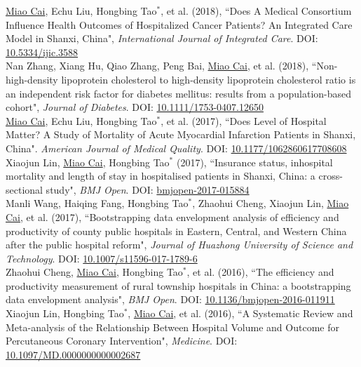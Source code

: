 \documentclass[11pt, a4paper]{article}
\newcommand{\years}[1]{\marginnote{\scriptsize #1}}
\begin{document}
\years{2018}\underline{Miao Cai}, Echu Liu, Hongbing Tao$^\ast$, et al. (2018), ``Does A Medical Consortium Influence Health Outcomes of Hospitalized Cancer Patients? An Integrated Care Model in Shanxi, China", \emph{International Journal of Integrated Care}. DOI: \href{https://doi.org/10.5334/ijic.3588}{10.5334/ijic.3588}\\
\years{2018}Nan Zhang, Xiang Hu, Qiao Zhang, Peng Bai, \underline{Miao Cai}, et al. (2018), ``Non-high-density lipoprotein cholesterol to high-density lipoprotein cholesterol ratio is an independent risk factor for diabetes mellitus: results from a population-based cohort", \emph{Journal of Diabetes}. DOI: \href{https://doi.org/10.1111/1753-0407.12650}{10.1111/1753-0407.12650}\\
\years{2017}\underline{Miao Cai}, Echu Liu, Hongbing Tao$^\ast$, et al. (2017), ``Does Level of Hospital Matter? A Study of Mortality of Acute Myocardial Infarction Patients in Shanxi, China". \emph{American Journal of Medical Quality}. DOI: \href{https://doi.org/10.1177/1062860617708608}{10.1177/1062860617708608}\\
\years{2017}Xiaojun Lin, \underline{Miao Cai}, Hongbing Tao$^\ast$ (2017), ``Insurance status, inhospital mortality and length of stay in hospitalised patients in Shanxi, China: a cross-sectional study", \emph{BMJ Open}. DOI: \href{https://doi.org/10.1136/bmjopen-2017-015884}{bmjopen-2017-015884}\\
\years{2017}Manli Wang, Haiqing Fang, Hongbing Tao$^\ast$, Zhaohui Cheng, Xiaojun Lin, \underline{Miao Cai}, et al. (2017), ``Bootstrapping data envelopment analysis of efficiency and productivity of county public hospitals in Eastern, Central, and Western China after the public hospital reform", \emph{Journal of Huazhong University of Science and Technology}. DOI: \href{https://doi.org/10.1007/s11596-017-1789-6}{10.1007/s11596-017-1789-6}\\
\years{2016}Zhaohui Cheng, \underline{Miao Cai}, Hongbing Tao$^\ast$, et al. (2016), ``The efficiency and productivity measurement of rural township hospitals in China: a bootstrapping data envelopment analysis", \emph{BMJ Open}. DOI: \href{https://doi.org/10.1136/bmjopen-2016-011911}{10.1136/bmjopen-2016-011911}\\
\years{2016}Xiaojun Lin, Hongbing Tao$^\ast$, \underline{Miao Cai}, et al. (2016), ``A Systematic Review and Meta-analysis of the Relationship Between Hospital Volume and Outcome for Percutaneous Coronary Intervention", \emph{Medicine}. DOI: \href{https://doi.org/10.1097/MD.0000000000002687}{10.1097/MD.0000000000002687}\\
\end{document}
